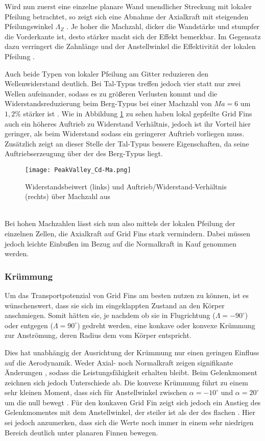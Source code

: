 Wird nun zuerst eine einzelne planare Wand unendlicher Streckung mit lokaler Pfeilung betrachtet, so zeigt sich eine Abnahme der Axialkraft mit steigenden Pfeilungswinkel $\Lambda_Z$ \cite{PeakValley}. Je hoher die Machzahl, dicker die Wandstärke und stumpfer die Vorderkante ist, desto stärker macht sich der Effekt bemerkbar. Im Gegensatz dazu verringert die Zahnlänge und der Anstellwinkel die Effektivität der lokalen Pfeilung \cite{PeakValley}.

Auch beide Typen von lokaler Pfeilung am Gitter reduzieren den Wellenwiderstand deutlich. Bei Tal-Typus treffen jedoch vier statt nur zwei Wellen aufeinander, sodass es zu größeren Verlusten kommt und die Widerstandsreduzierung beim Berg-Typus bei einer Machzahl von $Ma=6$ um $1,2\%$ stärker ist \cite{PeakValley}.
Wie in Abbildung \ref{abb_PeakValley-Ma} zu sehen haben lokal gepfeilte Grid Fins auch ein höheres Auftrieb zu Widerstand Verhältnis, jedoch ist ihr Vorteil hier geringer, als beim Widerstand sodass ein geringerer Auftrieb vorliegen muss. Zusätzlich zeigt an dieser Stelle der Tal-Typus bessere Eigenschaften, da seine Auftriebserzeugung über der des Berg-Typus liegt. 
\begin{figure}[h]
	\centering
	\texttt{[image: PeakValley\_Cd-Ma.png]}
	\caption{Widerstandsbeiwert (links) und Auftrieb/Widerstand-Verhältnis (rechts) über Machzahl aus \cite{PeakValley}}
	\label{abb_PeakValley-Ma}
\end{figure}\\
Bei hohen Machzahlen lässt sich nun also mittels der lokalen Pfeilung der einzelnen Zellen, die Axialkraft auf Grid Fins stark vermindern. Dabei müssen jedoch leichte Einbußen im Bezug auf die Normalkraft in Kauf genommen werden.
\subsubsection{Krümmung}
Um das Transportpotenzial von Grid Fins am besten nutzen zu können, ist es wünschenswert, dass sie sich im eingeklappten Zustand an den Körper anschmiegen. Somit hätten sie, je nachdem ob sie in Flugrichtung ($\Lambda = -90^\circ$) oder entgegen ($\Lambda = 90^\circ$) gedreht werden, eine konkave oder konvexe Krümmung zur Anströmung, deren Radius dem vom Körper entspricht.

Dies hat unabhängig der Ausrichtung der Krümmung nur einen geringen Einfluss auf die Aerodynamik. Weder Axial- noch Normalkraft zeigen signifikante Änderungen \cite{LambdaKonf}, sodass die Leistungsfähigkeit erhalten bleibt. Beim Gelenkmoment zeichnen sich jedoch Unterschiede ab. Die konvexe Krümmung führt zu einem sehr kleinen Moment, dass sich für Anstellwinkel zwischen $\alpha = -10^\circ$ und $\alpha=20^\circ$ um die null bewegt \cite{LambdaKonf}. Für den konkaven Grid Fin zeigt sich jedoch ein Anstieg des Gelenkmomentes mit dem Anstellwinkel, der steiler ist als der des flachen \cite{LambdaKonf}. Hier sei jedoch anzumerken, dass sich die Werte noch immer in einem sehr niedrigen Bereich deutlich unter planaren Finnen bewegen.

